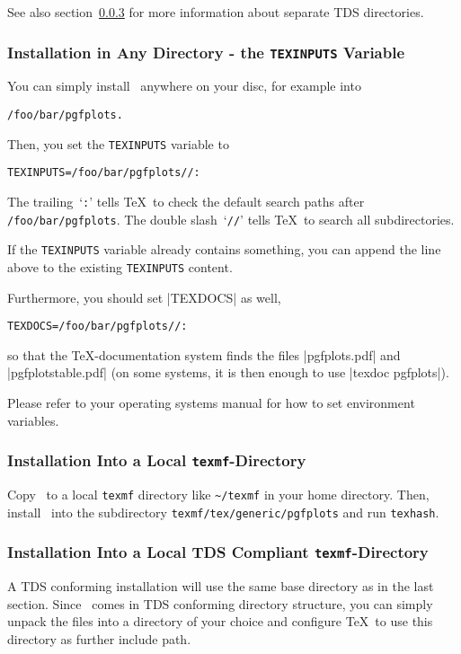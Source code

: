 See also section~\ref{pgfplots:tds} for more information about separate TDS directories.

\subsubsection{Installation in Any Directory - the \texttt{TEXINPUTS} Variable}
You can simply install \PGFPlots\ anywhere on your disc, for example into
\begin{verbatim}
/foo/bar/pgfplots.
\end{verbatim}
Then, you set the \texttt{TEXINPUTS} variable to
\begin{verbatim}
TEXINPUTS=/foo/bar/pgfplots//:
\end{verbatim}
The trailing~`\texttt{:}' tells \TeX\ to check the default search paths after \lstinline!/foo/bar/pgfplots!. The double slash~`\texttt{//}' tells \TeX\ to search all subdirectories.

If the \texttt{TEXINPUTS} variable already contains something, you can append the line above to the existing \texttt{TEXINPUTS} content.

Furthermore, you should set |TEXDOCS| as well,
\begin{verbatim}
TEXDOCS=/foo/bar/pgfplots//:
\end{verbatim}
so that the \TeX-documentation system finds the files |pgfplots.pdf| and |pgfplotstable.pdf| (on some systems, it is then enough to use |texdoc pgfplots|).

Please refer to your operating systems manual for how to set environment variables.

\subsubsection{Installation Into a Local \texttt{texmf}-Directory}
Copy \PGFPlots\ to a local \texttt{texmf} directory like \lstinline!~/texmf! in your home directory. Then, install \PGFPlots\ into the subdirectory \lstinline!texmf/tex/generic/pgfplots! and run \lstinline!texhash!.

\subsubsection{Installation Into a Local TDS Compliant \texttt{texmf}-Directory}
\label{pgfplots:tds}
A TDS conforming installation will use the same base directory as in the last section. Since \PGFPlots\ comes in TDS conforming directory structure, you can simply unpack the files into a directory of your choice and configure \TeX\ to use this directory as further include path.

